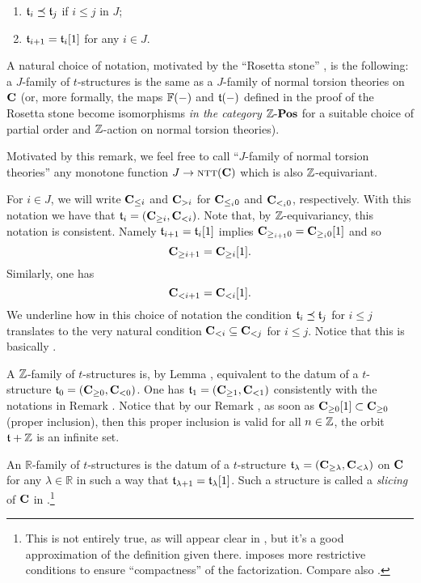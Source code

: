  \begin{enumerate}
\item $\mathfrak{t}_i\preceq \mathfrak{t}_j$ if $i\leq j$ in $J$;
\item $\mathfrak{t}_{i+1}=\mathfrak{t}_i[1]$ for any $i\in J$.
 \end{enumerate}
\begin{remark}
A natural choice of notation, motivated by the ``Rosetta stone'' , is the following: a $J$\hyp{}family of $t$\hyp{}structures is the same as a $J$\hyp{}family of normal torsion theories on $\textbf{C}$ (or, more formally, the maps $\mathbb{F}(-)$ and $\mathfrak{t}(-)$ defined in the proof of the Rosetta stone become isomorphisms \emph{in the category $\mathbb{Z}\text{-}\textbf{Pos}$} for a suitable choice of partial order and $\mathbb{Z}$\hyp{}action on normal torsion theories).

Motivated by this remark, we feel free to call ``$J$\hyp{}family of normal torsion theories'' any monotone function $J\to \text{\scshape ntt}(\textbf{C})$ which is also $\mathbb{Z}$\hyp{}equivariant.
\end{remark}
\begin{notat}\label{magictrick}
For $i\in J$, we will write $\textbf{C}_{\leq i}$ and $\textbf{C}_{>i}$ for $\textbf{C}_{\leq_i0}$ and $\textbf{C}_{<_i0}$, respectively. With this notation we have that $\mathfrak{t}_i=(\textbf{C}_{\geq i},\textbf{C}_{<i})$. Note that, by $\mathbb{Z} $\hyp{}equivariancy, this notation is consistent. Namely $\mathfrak{t}_{i+1}=\mathfrak{t}_i[1]$ implies $\textbf{C}_{\geq_{i+1}0}=\textbf{C}_{\geq_i0}[1]$ and so
\[
\textbf{C}_{\geq i+1}=\textbf{C}_{\geq i}[1].
\]
Similarly, one has
\[
\textbf{C}_{< i+1}=\textbf{C}_{< i}[1].
\]
We underline how in this choice of notation the condition $\mathfrak{t}_i\preceq \mathfrak{t}_j$ for $i\leq j$ translates to the very natural condition $\textbf{C}_{<i}\subseteq \textbf{C}_{<j}$ for $i\leq j$. Notice that this is basically \cite[\adef \textbf{3.1}]{GKR}.
\end{notat}
\begin{example}
A $\mathbb{Z} $\hyp{}family of $t$\hyp{}structures is, by Lemma , equivalent to the datum of a $t$\hyp{}structure $\mathfrak{t}_0=(\textbf{C}_{\geq 0},\textbf{C}_{<0})$. One has $\mathfrak{t}_1=(\textbf{C}_{\geq 1},\textbf{C}_{<1})$ consistently with the notations in Remark . Notice that by our Remark , as soon as $\textbf{C}_{\ge 0}[1]\subset \textbf{C}_{\ge 0}$ (proper inclusion), then this proper inclusion is valid for all $n\in\mathbb{Z}$, \ie the orbit $\mathfrak{t} + \mathbb{Z}$ is an infinite set.
\end{example}
\begin{example}\label{what.s.slici}
An $\mathbb{R}$\hyp{}family of $t$\hyp{}structures is the datum of a $t$\hyp{}structure $\mathfrak{t}_\lambda=(\textbf{C}_{\geq \lambda},\textbf{C}_{<\lambda})$ on $\textbf{C}$ for any $\lambda\in \mathbb{R}$ in such a way that $\mathfrak{t}_{\lambda+1}=\mathfrak{t}_\lambda[1]$. Such a structure is called a \emph{slicing} of $\textbf{C}$ in \cite{Brid}.\footnote{This is not entirely true, as will appear clear in \achap {}, but it's a good approximation of the definition given there. \cite{Brid} imposes more restrictive conditions to ensure ``compactness'' of the factorization. Compare also \cite{GKR}.} 
\end{example}
